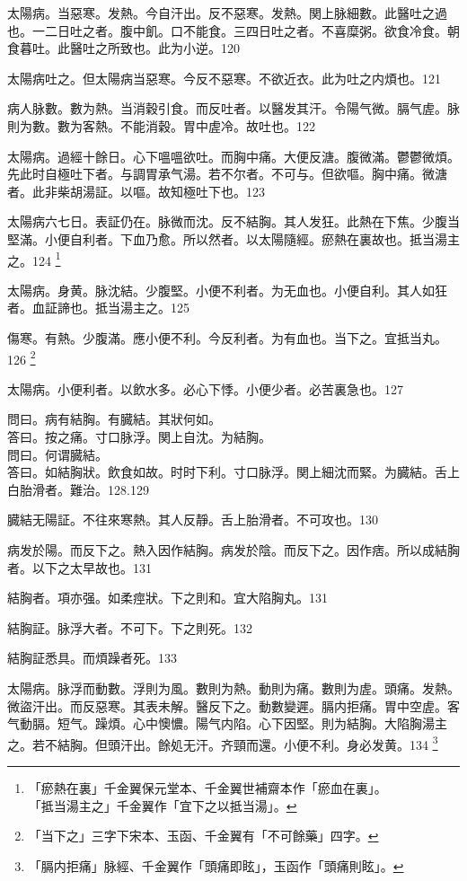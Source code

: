 \documentclass[b5paper,twoside,zihao=-4,UTF8]{ctexbook}
\begin{document}
太陽病。当惡寒。发熱。今自汗出。反不惡寒。发熱。関上脉細數。此醫吐之過也。一二日吐之者。腹中飢。口不能食。三四日吐之者。不喜糜粥。欲食冷食。朝食暮吐。此醫吐之所致也。此为小逆。120

太陽病吐之。但太陽病当惡寒。今反不惡寒。不欲近衣。此为吐之内煩也。121

病人脉數。數为熱。当消穀引食。而反吐者。以醫发其汗。令陽气微。膈气虗。脉則为數。數为客熱。不能消穀。胃中虗冷。故吐也。122

太陽病。過經十餘日。心下嗢嗢欲吐。而胸中痛。大便反溏。腹微滿。鬱鬱微煩。先{此}时自極吐下者。与{調胃}承气湯。若不尔者。不可与。但欲嘔。胸中痛。微溏者。此非柴胡湯証。以嘔。故知極吐下也。123

太陽病六七日。表証仍在。脉微而沈。反不結胸。其人发狂。此熱在下焦。少腹当堅滿。小便自利者。下血乃愈。所以然者。以太陽隨經。瘀熱在裏故也。抵当湯主之。124
	\footnote{「瘀熱在裏」千金翼保元堂本、千金翼世補齋本作「瘀血在裏」。\\「抵当湯主之」千金翼作「宜下之以抵当湯」。}

太陽病。身黄。脉沈結。少腹堅。小便不利者。为无血也。小便自利。其人如狂者。血証諦也。抵当湯主之。125

傷寒。有熱。少腹滿。應小便不利。今反利者。为有血也。当下之。宜抵当丸。126
	\footnote{「当下之」三字下宋本、玉函、千金翼有「不可餘藥」四字。}

太陽病。小便利者。以飲水多。必心下悸。小便少者。必苦裏急也。127

問曰。病有結胸。有臓結。其狀何如。\\
答曰。按之痛。寸口脉浮。関上自沈。为結胸。\\
問曰。何谓臓結。\\
答曰。如結胸狀。飲食如故。时时下利。寸口脉浮。関上細沈而緊。为臓結。舌上白胎滑者。難治。128.129

臓結无陽証。不往來寒熱。其人反靜。舌上胎滑者。不可攻也。130

病发於陽。而反下之。熱入因作結胸。病发於陰。而反下之。因作痞。所以成結胸者。以下之太早故也。131

結胸者。項亦强。如柔痙狀。下之則和。宜大陷胸丸。131

結胸証。脉浮大者。不可下。下之則死。132

結胸証悉具。而煩躁者死。133

太陽病。脉浮而動數。浮則为風。數則为熱。動則为痛。數則为虗。頭痛。发熱。微盜汗出。而反惡寒。其表未解。醫反下之。動數變遲。膈内拒痛。胃中空虗。客气動膈。短气。躁煩。心中懊憹。陽气内陷。心下因堅。則为結胸。大陷胸湯主之。若不結胸。但頭汗出。餘処无汗。齐頸而還。小便不利。身必发黄。134
	\footnote{「膈内拒痛」脉經、千金翼作「頭痛即眩」，玉函作「頭痛則眩」。}
\end{document}
